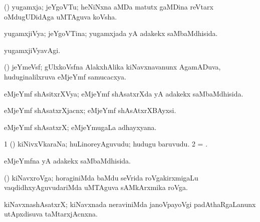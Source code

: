 \bentry
{}  
\gl{\nA} 
\bmng
(\jiVvi) yugamxja; jeYgoVTu; heNiNxna aMDa matutx gaMDina reVtarx oMdugUDidAga uMTAguva koVsha.
\emng
\eentry

\bentry
{} 
\gl{\gu} 
\bmng
yugamxjiVya; jeYgoVTina; yugamxjada yA adakekx saMbaMdhisida.
\emng
\eentry

\bentry
{} 
\gl{\kirxvi} 
\bmng
yugamxjiVyavAgi.
\emng
\eentry

\bentry
{} 
\gl{\nA} 
\bmng
(\jiVra) jeYmeVsf; gUlxkoVsfna AlakxhAlika  kiNavxnavanunx AgamADuva, huduginalilxruva eMjeYmf samucacxya.
\emng
\eentry

\bentry
{} 
\gl{\gu} 
\bmng
eMjeYmf shAsitxrXVya; eMjeYmf shAsatxrXda yA adakekx saMbaMdhisida.
\emng
\eentry

\bentry
{} 
\gl{\nA} 
\bmng
eMjeYmf shAsatxrXjacnx; eMjeYmf shAsAtxrXBAyxsi.
\emng
\eentry


\bentry
{} 
\gl{\nA} 
\bmng
eMjeYmf shAsatxrX; eMjeYmugaLa adhayxyana.
\emng
\eentry

\bentry
{} 
\gl{\nA} 
\bmng
\bnum
\num{1} (\pArxparx) kiNivxVkaraNa; huLinoreyAguvudu; hudugu baruvudu.
\num{2} = .
\enum
\emng
\eentry

\bentry
{}  
\gl{\gu} 
\bmng
eMjeYmfna yA adakekx saMbaMdhisida.
\emng
\eentry

\bentry
{} 
\gl{\nA} 
\bmng
(\pArxparx) kiNavxroVga; horaginiMda baMdu seVrida roVgakirxmigaLu vaqdidhxyAguvudariMda uMTAguva sAMkArxmika roVga.
\emng
\eentry

\bentry
{} 
\gl{\nA} 
\bmng
kiNavxnashAsatxrX; kiNavxnada neraviniMda janoVpayoVgi padAthaRgaLanunx utApxdisuva taMtarxjAcnxna.
\emng
\eentry

%

